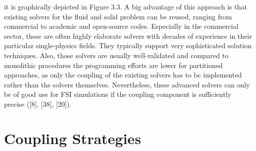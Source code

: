 it is graphically depicted in Figure 3.3. A big advantage of this approach is that existing solvers for
the fluid and solid problem can be reused, ranging from commercial to academic and open-source codes.
Especially in the commercial sector, these are often highly elaborate solvers with decades of experience in
their particular single-physics fields. They typically support very sophisticated solution techniques. Also,
those solvers are usually well-validated and compared to monolithic procedures the programming efforts
are lower for partitioned approaches, as only the coupling of the existing solvers has to be implemented
rather than the solvers themselves. Nevertheless, these advanced solvers can only be of good use for FSI
simulations if the coupling component is sufficiently precise ([8], [38], [20]).

\section{Coupling Strategies}

